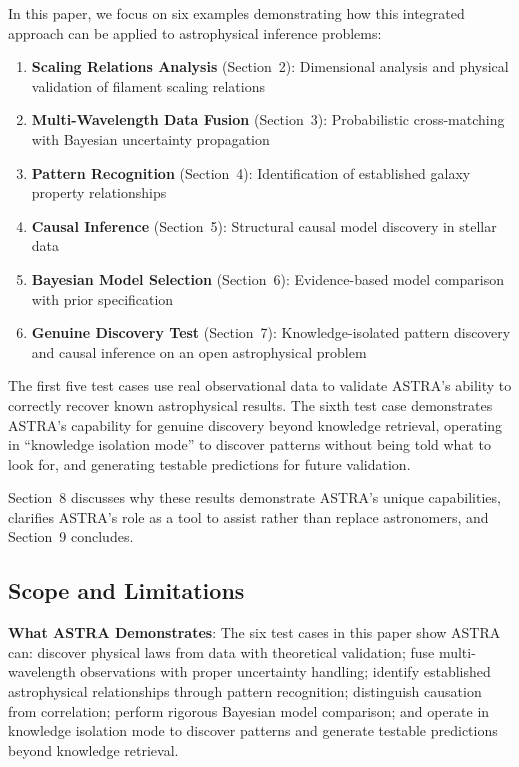 \documentclass[usenatbib]{rasti}
\begin{document}
In this paper, we focus on six examples demonstrating how this integrated approach can be applied to astrophysical inference problems:
\begin{enumerate}
\item \textbf{Scaling Relations Analysis} (Section~2): Dimensional analysis and physical validation of filament scaling relations
\item \textbf{Multi-Wavelength Data Fusion} (Section~3): Probabilistic cross-matching with Bayesian uncertainty propagation
\item \textbf{Pattern Recognition} (Section~4): Identification of established galaxy property relationships
\item \textbf{Causal Inference} (Section~5): Structural causal model discovery in stellar data
\item \textbf{Bayesian Model Selection} (Section~6): Evidence-based model comparison with prior specification
\item \textbf{Genuine Discovery Test} (Section~7): Knowledge-isolated pattern discovery and causal inference on an open astrophysical problem
\end{enumerate}

The first five test cases use real observational data to validate ASTRA's ability to correctly recover known astrophysical results. The sixth test case demonstrates ASTRA's capability for genuine discovery beyond knowledge retrieval, operating in ``knowledge isolation mode'' to discover patterns without being told what to look for, and generating testable predictions for future validation.

Section~8 discusses why these results demonstrate ASTRA's unique capabilities, clarifies ASTRA's role as a tool to assist rather than replace astronomers, and Section~9 concludes.

\subsection{Scope and Limitations}

\textbf{What ASTRA Demonstrates}: The six test cases in this paper show ASTRA can: discover physical laws from data with theoretical validation; fuse multi-wavelength observations with proper uncertainty handling; identify established astrophysical relationships through pattern recognition; distinguish causation from correlation; perform rigorous Bayesian model comparison; and operate in knowledge isolation mode to discover patterns and generate testable predictions beyond knowledge retrieval.
\end{document}
